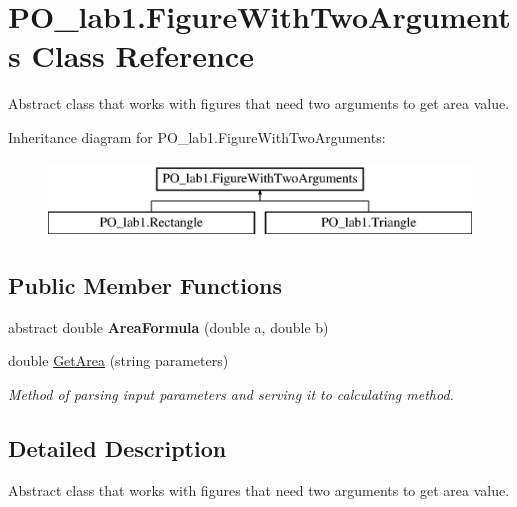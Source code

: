 \hypertarget{class_p_o__lab1_1_1_figure_with_two_arguments}{}\section{P\+O\+\_\+lab1.\+Figure\+With\+Two\+Arguments Class Reference}
\label{class_p_o__lab1_1_1_figure_with_two_arguments}


Abstract class that works with figures that need two arguments to get area value.  


Inheritance diagram for P\+O\+\_\+lab1.\+Figure\+With\+Two\+Arguments\+:\begin{figure}[H]
\begin{center}
\leavevmode
\includegraphics[height=2.000000cm]{class_p_o__lab1_1_1_figure_with_two_arguments}
\end{center}
\end{figure}
\subsection*{Public Member Functions}
\begin{DoxyCompactItemize}
\item 
\mbox{\label{class_p_o__lab1_1_1_figure_with_two_arguments_ab3b43a92430a6e866e04ea78627b22eb}} 
abstract double {\bfseries Area\+Formula} (double a, double b)
\item 
double \mbox{\hyperlink{class_p_o__lab1_1_1_figure_with_two_arguments_a443df5d9e9eb30bb0ab7d1af55557af4}{Get\+Area}} (string parameters)
\begin{DoxyCompactList}\small\item\em Method of parsing input parameters and serving it to calculating method. \end{DoxyCompactList}\end{DoxyCompactItemize}


\subsection{Detailed Description}
Abstract class that works with figures that need two arguments to get area value. 



